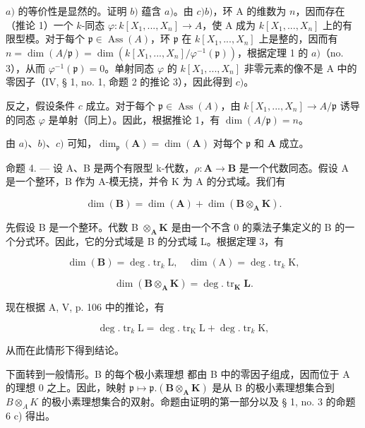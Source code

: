 \(a)\) 的等价性是显然的。证明 \(b)\) 蕴含 \(a)\)。由 \(c)\)\(b)\)，环 A 的维数为 \(n\)，因而存在（推论 1）一个 \(k\)-同态 \(\varphi : k[X_1, ..., X_n] \to A\)，使 A 成为 \(k[X_1, ..., X_n]\) 上的有限型模。对于每个 \(\mathfrak{p} \in \operatorname{Ass}(A)\)，环 \(\mathfrak{p}\) 在 \(k[X_1, ..., X_n]\) 上是整的，因而有 \(n = \dim(A/\mathfrak{p}) = \dim(k[X_1, ..., X_n]/\varphi^{-1}(\mathfrak{p}))\)，根据定理 1 的 \(a)\)（no. 3），从而 \(\varphi^{-1}(\mathfrak{p}) = 0\)。单射同态 \(\varphi\) 的 \(k[X_1, ..., X_n]\) 非零元素的像不是 A 中的零因子（IV, § 1, no. 1, 命题 2 的推论 3），因此得到 \(c)\)。

反之，假设条件 \(c\) 成立。对于每个 \(\mathfrak{p} \in \operatorname{Ass}(A)\)，由 \(k[X_1, ..., X_n] \to A/\mathfrak{p}\) 诱导的同态 \(\varphi\) 是单射（同上）。因此，根据推论 1，有 \(\dim(A/\mathfrak{p}) = n\)。

由 \(a)\)、\(b)\)、\(c)\) 可知，\(\dim_{\mathfrak{p}}(\mathbf{A}) = \dim(\mathbf{A})\) 对每个 \(\mathfrak{p}\) 和 \(\mathbf{A}\) 成立。

命题 4. --- 设 A、B 是两个有限型 k-代数，\(\rho: \mathbf{A} \to \mathbf{B}\) 是一个代数同态。假设 A 是一个整环，B 作为 A-模无挠，并令 K 为 A 的分式域。我们有

\[
\dim (\mathbf {B}) = \dim (\mathbf {A}) + \dim (\mathbf {B} \otimes_ {\mathbf {A}} \mathbf {K}).
\]

先假设 B 是一个整环。代数 B \(\otimes_{\mathbf{A}} \mathbf{K}\) 是由一个不含 0 的乘法子集定义的 B 的一个分式环。因此，它的分式域是 B 的分式域 L。根据定理 3，有

\[
\dim (\mathbf {B}) = \deg . \operatorname{tr} _ {k} \mathrm{L}, \quad \dim (\mathrm{A}) = \deg . \operatorname{tr} _ {k} \mathrm{K},
\]

\[
\dim (\mathbf {B} \otimes_ {\mathbf {A}} \mathbf {K}) = \deg . \operatorname{tr} _ {\mathbf {K}} \mathbf {L}.
\]

现在根据 A, V, p. 106 中的推论，有

\[
\deg . \operatorname{tr} _ {k} \mathrm{L} = \deg . \operatorname{tr} _ {\mathrm{K}} \mathrm{L} + \deg . \operatorname{tr} _ {k} \mathrm{K},
\]

从而在此情形下得到结论。

下面转到一般情形。B 的每个极小素理想  都由 B 中的零因子组成，因而位于 A 的理想 0 之上。因此，映射 \(\mathfrak{p} \mapsto \mathfrak{p}.(\mathbf{B} \otimes_{\mathbf{A}} \mathbf{K})\) 是从 B 的极小素理想集合到 \(B \otimes_{A} K\) 的极小素理想集合的双射。命题由证明的第一部分以及 § 1, no. 3 的命题 6 c) 得出。

